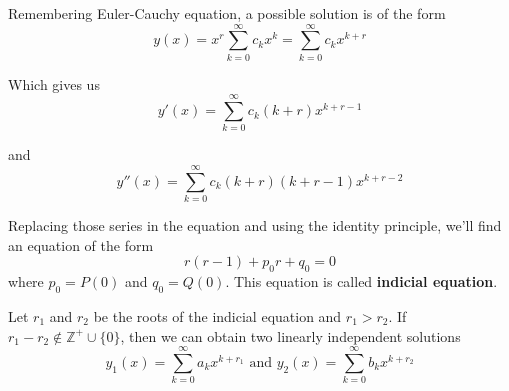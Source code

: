 \documentclass[12pt,a4paper]{article}
\begin{document}
Remembering Euler-Cauchy equation, a possible solution is of the form
\[
y(x) = x^r \sum_{k=0}^{\infty} c_k x^k = \sum_{k=0}^{\infty} c_k x^{k+r}
\]

Which gives us
\[
y'(x) = \sum_{k=0}^{\infty} c_k (k+r) x^{k+r-1}
\]

and
\[
y''(x) = \sum_{k=0}^{\infty} c_k (k+r)(k+r-1) x^{k+r-2}
\]

Replacing those series in the equation and using the identity principle, we'll find an equation of the form 
\[
r(r-1)+p_0 r + q_0 = 0
\]
where $p_0 = P(0)$ and $q_0 = Q(0)$. This equation is called \textbf{indicial equation}. 

Let $r_1$ and $r_2$ be the roots of the indicial equation and $r_1 > r_2$. If $r_1 - r_2 \not \in \mathbb{Z}^+ \cup \{ 0 \}$, then we can obtain two linearly independent solutions
\[
y_1(x) = \sum_{k=0}^{\infty} a_k x^{k+r_1} \text{ and } y_2(x) = \sum_{k=0}^{\infty} b_k x^{k+r_2} 
\]
\end{document}
